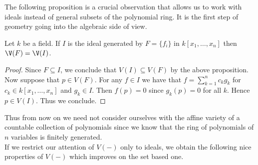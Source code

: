 \documentclass[a4paper]{article}
\begin{document}
The following proposition is a crucial observation that allows us to work with ideals instead of general subsets of the polynomial ring. It is the first step of geometry going into the algebraic side of view. 

\begin{prp}{}{} Let $k$ be a field. If $I$ is the ideal generated by $F=\{f_i\}$ in $k[x_1,\dots,x_n]$ then $\V(F)=\V(I)$. \tcbline
\begin{proof}
Since $F\subseteq I$, we conclude that $V(I)\subseteq V(F)$ by the above proposition. Now suppose that $p\in V(F)$. For any $f\in I$ we have that $f=\sum_{k=1}^nc_kg_k$ for $c_k\in k[x_1,\dots,x_n]$ and $g_k\in I$. Then $f(p)=0$ since $g_k(p)=0$ for all $k$. Hence $p\in V(I)$. Thus we conclude. 
\end{proof}
\end{prp}

Thus from now on we need not consider ourselves with the affine variety of a countable collection of polynomials since we know that the ring of polynomials of $n$ variables is finitely generated. \\

If we restrict our attention of $V(-)$ only to ideals, we obtain the following nice properties of $V(-)$ which improves on the set based one. 
\end{document}
